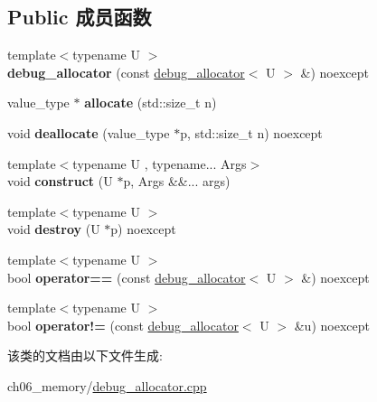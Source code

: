 \subsection*{Public 成员函数}
\begin{DoxyCompactItemize}
\item 
\mbox{\label{classdebug__allocator_add88bf2a6be0b7de7b157af7d1916ecf}} 
{\footnotesize template$<$typename U $>$ }\\{\bfseries debug\+\_\+allocator} (const \mbox{\hyperlink{classdebug__allocator}{debug\+\_\+allocator}}$<$ U $>$ \&) noexcept
\item 
\mbox{\label{classdebug__allocator_a4102a2377a61ea04d0855fe0576b5beb}} 
value\+\_\+type $\ast$ {\bfseries allocate} (std\+::size\+\_\+t n)
\item 
\mbox{\label{classdebug__allocator_ab9ed1fc2a0ad9a463a64ec81f59157f4}} 
void {\bfseries deallocate} (value\+\_\+type $\ast$p, std\+::size\+\_\+t n) noexcept
\item 
\mbox{\label{classdebug__allocator_ae2870576b2f8a00ae04bdfaf4144e123}} 
{\footnotesize template$<$typename U , typename... Args$>$ }\\void {\bfseries construct} (U $\ast$p, Args \&\&... args)
\item 
\mbox{\label{classdebug__allocator_a37c8e2b9100e304c4e1ca7e3770d946a}} 
{\footnotesize template$<$typename U $>$ }\\void {\bfseries destroy} (U $\ast$p) noexcept
\item 
\mbox{\label{classdebug__allocator_a00de989a2ef26e5d4ff8f0d16d0e5e5c}} 
{\footnotesize template$<$typename U $>$ }\\bool {\bfseries operator==} (const \mbox{\hyperlink{classdebug__allocator}{debug\+\_\+allocator}}$<$ U $>$ \&) noexcept
\item 
\mbox{\label{classdebug__allocator_ad25d2cc5b445927057769c404cd9e4ff}} 
{\footnotesize template$<$typename U $>$ }\\bool {\bfseries operator!=} (const \mbox{\hyperlink{classdebug__allocator}{debug\+\_\+allocator}}$<$ U $>$ \&u) noexcept
\end{DoxyCompactItemize}


该类的文档由以下文件生成\+:\begin{DoxyCompactItemize}
\item 
ch06\+\_\+memory/\mbox{\hyperlink{debug__allocator_8cpp}{debug\+\_\+allocator.\+cpp}}\end{DoxyCompactItemize}
